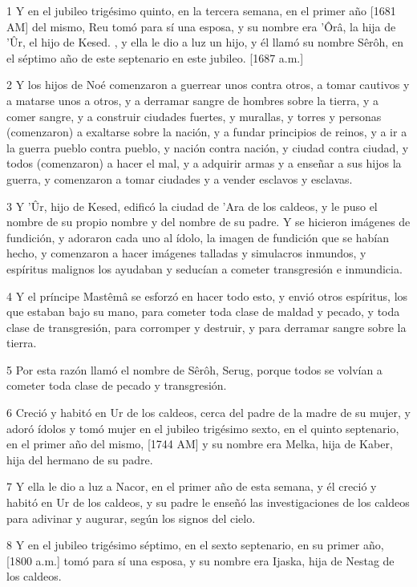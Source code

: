 \par 1 Y en el jubileo trigésimo quinto, en la tercera semana, en el primer año [1681 AM] del mismo, Reu tomó para sí una esposa, y su nombre era 'Ôrâ, la hija de 'Ûr, el hijo de Kesed. , y ella le dio a luz un hijo, y él llamó su nombre Sêrôh, en el séptimo año de este septenario en este jubileo. [1687 a.m.]
\par 2 Y los hijos de Noé comenzaron a guerrear unos contra otros, a tomar cautivos y a matarse unos a otros, y a derramar sangre de hombres sobre la tierra, y a comer sangre, y a construir ciudades fuertes, y murallas, y torres y personas (comenzaron) a exaltarse sobre la nación, y a fundar principios de reinos, y a ir a la guerra pueblo contra pueblo, y nación contra nación, y ciudad contra ciudad, y todos (comenzaron) a hacer el mal, y a adquirir armas y a enseñar a sus hijos la guerra, y comenzaron a tomar ciudades y a vender esclavos y esclavas.
\par 3 Y 'Ûr, hijo de Kesed, edificó la ciudad de 'Ara de los caldeos, y le puso el nombre de su propio nombre y del nombre de su padre. Y se hicieron imágenes de fundición, y adoraron cada uno al ídolo, la imagen de fundición que se habían hecho, y comenzaron a hacer imágenes talladas y simulacros inmundos, y espíritus malignos los ayudaban y seducían a cometer transgresión e inmundicia.
\par 4 Y el príncipe Mastêmâ se esforzó en hacer todo esto, y envió otros espíritus, los que estaban bajo su mano, para cometer toda clase de maldad y pecado, y toda clase de transgresión, para corromper y destruir, y para derramar sangre sobre la tierra.
\par 5 Por esta razón llamó el nombre de Sêrôh, Serug, porque todos se volvían a cometer toda clase de pecado y transgresión.
\par 6 Creció y habitó en Ur de los caldeos, cerca del padre de la madre de su mujer, y adoró ídolos y tomó mujer en el jubileo trigésimo sexto, en el quinto septenario, en el primer año del mismo, [1744 AM] y su nombre era Melka, hija de Kaber, hija del hermano de su padre.
\par 7 Y ella le dio a luz a Nacor, en el primer año de esta semana, y él creció y habitó en Ur de los caldeos, y su padre le enseñó las investigaciones de los caldeos para adivinar y augurar, según los signos del cielo.
\par 8 Y en el jubileo trigésimo séptimo, en el sexto septenario, en su primer año, [1800 a.m.] tomó para sí una esposa, y su nombre era Ijaska, hija de Nestag de los caldeos.
